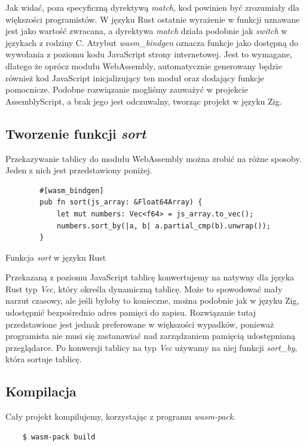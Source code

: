 \documentclass[language=polish,type=master]{aghmodern}
\begin{document}
Jak widać, poza specyficzną dyrektywą \emph{match}, kod powinien być zrozumiały dla większości programistów.
W języku Rust ostatnie wyrażenie w funkcji uznawane jest jako wartość zwracana, a dyrektywa \emph{match} działa podobnie jak \emph{switch} w językach z rodziny C.
Atrybut \emph{wasm\_bindgen} oznacza funkcje jako dostępną do wywołania z poziomu kodu JavaScript strony internetowej.
Jest to wymagane, dlatego że oprócz modułu WebAssembly, automatycznie generowany będzie również kod JavaScript inicjalizujący ten moduł oraz dodający funkcje pomocnicze.
Podobne rozwiązanie mogliśmy zauważyć w projekcie AssemblyScript, a brak jego jest odczuwalny, tworząc projekt w języku Zig.

\clearpage

\subsection{Tworzenie funkcji \emph{sort}}
Przekazywanie tablicy do modułu WebAssembly można zrobić na różne sposoby.
Jeden z nich jest przedstawiony poniżej.

\begin{listing}[H]
    \begin{verbatim}
        #[wasm_bindgen]
        pub fn sort(js_array: &Float64Array) {
            let mut numbers: Vec<f64> = js_array.to_vec();
            numbers.sort_by(|a, b| a.partial_cmp(b).unwrap());
        }
    \end{verbatim}
    \caption{Funkcja \emph{sort} w języku Rust}
\end{listing}

Przekazaną z poziomu JavaScript tablicę konwertujemy na natywny dla języka Rust typ \emph{Vec}, który określa dynamiczną tablicę.
Może to spowodować mały narzut czasowy, ale jeśli byłoby to konieczne, można podobnie jak w języku Zig, udostępnić bezpośrednio adres pamięci do zapisu.
Rozwiązanie tutaj przedstawione jest jednak preferowane w większości wypadków, ponieważ programista nie musi się zastanawiać nad zarządzaniem pamięcią udostępnianą przeglądarce.
Po konwersji tablicy na typ \emph{Vec} używamy na niej funkcji \emph{sort\_by}, która sortuje tablicę.

\subsection{Kompilacja}
Cały projekt kompilujemy, korzystając z programu \emph{wasm-pack}.

\begin{verbatim}
    $ wasm-pack build
\end{verbatim}
\end{document}
